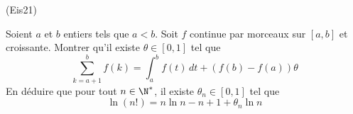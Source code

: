 \begin{tiny}(Eis21)\end{tiny} Soient $a$ et $b$ entiers tels que $a<b$. Soit $f$ continue par morceaux sur $[a,b]$ et croissante. Montrer qu'il existe $\theta\in[0,1]$ tel que
\begin{displaymath}
 \sum_{k=a+1}^bf(k)=\int_a^bf(t)\,dt + (f(b)-f(a))\theta
\end{displaymath}
En déduire que pour tout $n\in\N^*$, il existe $\theta_n\in[0,1]$ tel que
\begin{displaymath}
 \ln(n!)=n\ln n -n + 1 +\theta_n \ln n
\end{displaymath}
 